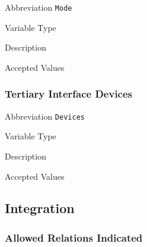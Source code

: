 \begin{AlignedDesc}
  \item[Abbreviation] \texttt{Mode}

  \item[Variable Type]

  \item[Description]

  \item[Accepted Values]

  \begin{AlignedDesc}
    \item[\textellipsis]
  \end{AlignedDesc}

\end{AlignedDesc}

\subsubsection{Tertiary Interface Devices}
\label{subsec:devices}

\begin{AlignedDesc}
  \item[Abbreviation] \texttt{Devices}

  \item[Variable Type]

  \item[Description]

  \item[Accepted Values]

  \begin{AlignedDesc}
    \item[\textellipsis]
  \end{AlignedDesc}

\end{AlignedDesc}


\subsection{Integration}
\label{sec:integration}

\subsubsection{Allowed Relations Indicated}
\label{subsec:relations}

